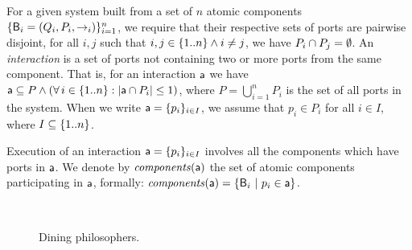 \bd[Interaction] For a given system built from a set of $n$ atomic components 
$\{\mathsf{B}_i = (Q_i, P_i, \stackrel{}{\rightarrow}_i)\}_{i=1}^n$, we require that their respective sets of ports are
pairwise disjoint,
\ie for all $i, j$ such that $i, j \in \{ 1..n \} \land i \ne j$, we have $P_i \cap P_j = \emptyset$.
An {\em interaction} is a set of ports not containing two or more ports from the same component.
That is, for an interaction $\mathsf{a}$ we have 
$\mathsf{a} \subseteq P \land (\forall\, i \in \{ 1..n \}: |\mathsf{a} \cap P_i| \le 1)$, where 
$P = \bigcup_{i=1}^n P_i$ is the set of all ports in the
system. When we write $\mathsf{a} = \{p_i\}_{i \in I}$, we assume that
$p_i \in P_i$ for all $i \in I$, where $I \subseteq \{ 1..n \}$.
\ed

\noindent
Execution of an interaction
$\mathsf{a} = \{p_i\}_{i \in I}$
involves all the components which have
ports in $\mathsf{a}$.  
We denote by $\mathit{components}(\mathsf{a})$ the
set of atomic components participating in $\mathsf{a}$, formally:
$\mathit{components}(\mathsf{a}) = \{\mathsf{B}_i ~|~ p_i \in \mathsf{a}\}$. 


\begin{figure}[t]
  \begin{center}
    \mbox{
       \quad
      }
    \caption{Dining philosophers.}
    \label{fig:diningSpectrum}
  \end{center}
\end{figure}








